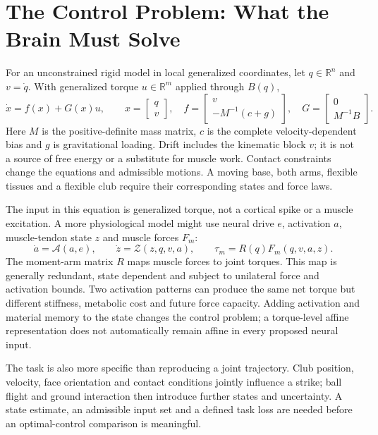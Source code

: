 \section{The Control Problem: What the Brain Must Solve}
\label{sec:ch24_control_problem}
\label{constr:box:ch24_constraints}
For an unconstrained rigid model in local generalized coordinates, let $q\in\mathbb R^n$ and $v=\dot q$. With generalized torque $u\in\mathbb R^m$ applied through $B(q)$,
\begin{equation}
\dot x=f(x)+G(x)u,\qquad
x=\begin{bmatrix}q\\v\end{bmatrix},\quad
f=\begin{bmatrix}v\\-M^{-1}(c+g)\end{bmatrix},\quad
G=\begin{bmatrix}0\\M^{-1}B\end{bmatrix}.
\label{eq:ch24_control_affine}
\end{equation}
Here $M$ is the positive-definite mass matrix, $c$ is the complete velocity-dependent bias and $g$ is gravitational loading. Drift includes the kinematic block $v$; it is not a source of free energy or a substitute for muscle work. Contact constraints change the equations and admissible motions. A moving base, both arms, flexible tissues and a flexible club require their corresponding states and force laws.

The input in this equation is generalized torque, not a cortical spike or a muscle excitation. A more physiological model might use neural drive $e$, activation $a$, muscle-tendon state $z$ and muscle forces $F_m$:
\[
\dot a=\mathcal A(a,e),\qquad \dot z=\mathcal Z(z,q,v,a),\qquad
\tau_m=R(q)F_m(q,v,a,z).
\]
The moment-arm matrix $R$ maps muscle forces to joint torques. This map is generally redundant, state dependent and subject to unilateral force and activation bounds. Two activation patterns can produce the same net torque but different stiffness, metabolic cost and future force capacity. Adding activation and material memory to the state changes the control problem; a torque-level affine representation does not automatically remain affine in every proposed neural input.

The task is also more specific than reproducing a joint trajectory. Club position, velocity, face orientation and contact conditions jointly influence a strike; ball flight and ground interaction then introduce further states and uncertainty. A state estimate, an admissible input set and a defined task loss are needed before an optimal-control comparison is meaningful.

